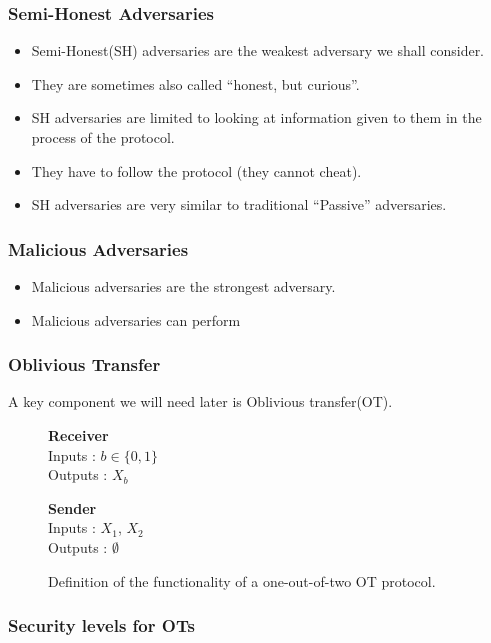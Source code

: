 \documentclass{beamer}
\begin{document}
	\begin{frame}
		\frametitle{Semi-Honest Adversaries}
		\begin{itemize}
			\item Semi-Honest(SH) adversaries are the weakest adversary we shall consider.
			\item They are sometimes also called ``honest, but curious''.
			\item SH adversaries are limited to looking at information given to them in the process of the protocol.
			\item They have to follow the protocol (they cannot cheat). 
			\item SH adversaries are very similar to traditional ``Passive'' adversaries.
		\end{itemize}
	\end{frame}

	\begin{frame}
		\frametitle{Malicious Adversaries}
		\begin{itemize}
			\item Malicious adversaries are the strongest adversary.
			\item Malicious adversaries can perform 
		\end{itemize}
	\end{frame}


	\begin{frame}
		\frametitle{Oblivious Transfer}
		A key component we will need later is Oblivious transfer(OT).\\
      
		\begin{figure}[!htb]
				\centering
				\begin{minipage}{0.45\textwidth}
					\centering
					\textbf{Receiver}\\
					Inputs : $b \in \{0, 1\}$\\
					Outputs : $X_b$\\
				\end{minipage}

				\begin{minipage}{0.45\textwidth}
					\centering
					\textbf{Sender}\\
					Inputs : $X_1$, $X_2$\\
					Outputs : $\emptyset$\\
				\end{minipage}

			\caption{ Definition of the functionality of a one-out-of-two OT protocol.\label{fig:OTformalDef}}
		\end{figure}

	\end{frame}


	\begin{frame}
		\frametitle{Security levels for OTs}
		
	\end{frame}
\end{document}
